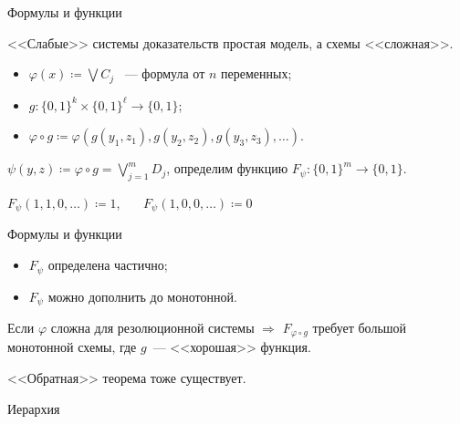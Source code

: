 \begin{frame}{Формулы и функции}

    <<Слабые>> системы доказательств простая модель, а схемы <<сложная>>. 

    \pause

    \begin{itemize}
        \item $\varphi(x) \coloneqq \bigvee C_j$ ~--- формула от $n$ переменных;
        \item $g\colon \{0, 1\}^k \times \{0, 1\}^{\ell} \to \{0, 1\}$;
        \pause
        \item $\varphi \circ g \coloneqq \varphi(g(y_1, z_1), g(y_2, z_2), g(y_3, z_3), \dots)$.
    \end{itemize}

    \pause
    $\psi(y, z) \coloneqq \varphi \circ g = \bigvee\limits_{j = 1}^{m} D_j$, определим функцию
    $F_{\psi}\colon \{0, 1\}^m \to \{0, 1\}$.
    \pause
    \vspace{-0.2cm}
    \begin{center}
        
    \end{center}

    \pause
    $F_{\psi}(1, 1, 0, \dots) \coloneqq 1$\pause, ~~~$F_{\psi}(1, 0, 0, \dots) \coloneqq 0$
\end{frame}

\begin{frame}{Формулы и функции}

    \pause
    \begin{itemize}
        \item $F_{\psi}$ определена частично;
            \pause
        \item $F_{\psi}$ можно дополнить до монотонной.
    \end{itemize}

    \begin{theorem}
        Если $\varphi$ сложна для резолюционной системы $\Rightarrow$ $F_{\varphi \circ g}$ требует
        большой \alert{монотонной} схемы, где $g$~--- <<хорошая>> функция.
    \end{theorem}

    \pause

    <<Обратная>> теорема тоже существует.
\end{frame}

\begin{frame}{Иерархия}

    
    
\end{frame}
